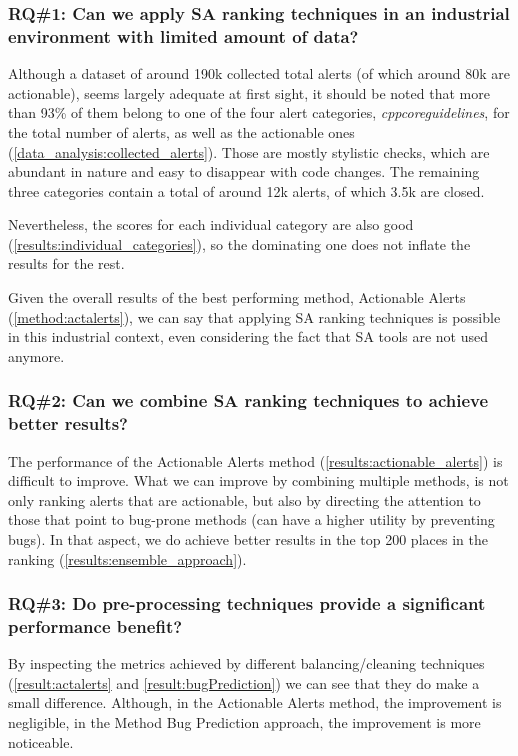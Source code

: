 \subsubsection{RQ\#1: Can we apply SA ranking techniques in an industrial environment with limited amount of data?}

Although a dataset of around 190k collected total alerts (of which around 80k are actionable), seems largely adequate at first sight, it should be noted that more than 93\% of them belong to one of the four alert categories, \textit{cppcoreguidelines}, for the total number of alerts, as well as the actionable ones (\cref{data_analysis:collected_alerts}). Those are mostly stylistic checks, which are abundant in nature and easy to disappear with code changes. The remaining three categories contain a total of around 12k alerts, of which 3.5k are closed.

Nevertheless, the scores for each individual category are also good (\cref{results:individual_categories}), so the dominating one does not inflate the results for the rest.

Given the overall results of the best performing method, Actionable Alerts (\cref{method:actalerts}), we can say that applying SA ranking techniques is possible in this industrial context, even considering the fact that SA tools are not used anymore.

\subsubsection{RQ\#2: Can we combine SA ranking techniques to achieve better results?}

The performance of the Actionable Alerts method (\cref{results:actionable_alerts}) is difficult to improve. What we can improve by combining multiple methods, is not only ranking alerts that are actionable, but also by directing the attention to those that point to bug-prone methods (can have a higher utility by preventing bugs). In that aspect, we do achieve better results in the top 200 places in the ranking (\cref{results:ensemble_approach}).


\subsubsection{RQ\#3: Do pre-processing techniques provide a significant performance benefit?}

By inspecting the metrics achieved by different balancing/cleaning techniques (\cref{result:actalerts} and \cref{result:bugPrediction}) we can see that they do make a small difference. Although, in the Actionable Alerts method, the improvement is negligible, in the Method Bug Prediction approach, the improvement is more noticeable.

